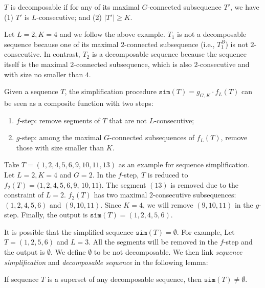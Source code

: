 \begin{definition}
$T$ is decomposable if for any of its maximal $G$-connected subsequence $T'$, we have (1) $T'$ is $L$-consecutive; and (2) $|T'|\geq K$.
\end{definition}

\begin{example}
Let $L = 2, K = 4$ and we follow the above example. $T_1$ is not a decomposable sequence
because one of its maximal $2$-connected subsequence (i.e., $T_1^B$) is not $2$-consecutive.
In contrast, $T_2$ is a decomposable sequence because the sequence itself is the maximal $2$-connected subsequence, which is also $2$-consecutive and with size no smaller than $4$.
\end{example}

\begin{definition}
Given a sequence $T$, the simplification procedure $\mathtt{sim}(T) =  g_{G,K} \cdot f_L(T) $ can be seen as a composite function with two steps: 
\begin{enumerate}[nosep]
\item $f$-step: remove segments of $T$ that are not $L$-consecutive;
\item $g$-step: among the maximal $G$-connected subsequences of $f_L(T)$, remove those with size smaller than $K$.
\end{enumerate}
\end{definition}


\begin{example}
Take $T=(1,2,4,5,6,9,10,11,13)$ as an example for sequence simplification. 
Let $L = 2, K = 4$ and $G = 2$. In the $f$-step, $T$ is reduced to $f_2(T)=(1,2,4,5,6,9$, $10,11)$. 
The segment $(13)$ is removed due to the constraint of $L=2$. 
$f_2(T)$ has two maximal $2$-consecutive subsequences: $(1,2,4,5,6)$ and $(9,10,11)$. 
Since $K=4$, we will remove $(9,10,11)$ in the $g$-step. Finally, the output is $\mathtt{sim}(T)=(1,2,4,5,6)$.
\end{example}

It is possible that the simplified sequence $\mathtt{sim}(T)=\emptyset$. For example, Let $T=(1,2,5,6)$ 
and $L=3$. All the segments will be removed in the $f$-step and the output is $\emptyset$.
We define $\emptyset$ to be not decomposable. 
We then link \emph{sequence simplification} and \emph{decomposable sequence} in the following lemma:
\begin{lemma}\label{lemma:decom-sim}
If sequence $T$ is a superset of any decomposable sequence, then $\mathtt{sim}(T) \neq \emptyset$.
\end{lemma}

